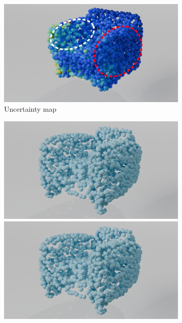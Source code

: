 \begin{figure}[htb]
\begin{subfigure}[t]{0.315\textwidth}
            \includegraphics[width=\textwidth]{figures/percent/1024_umap_edited.png}
            \caption{Uncertainty map}\label{fig:partialpercentchair2}
          \end{subfigure}\hfill
          \begin{subfigure}[t]{0.315\textwidth}
            \includegraphics[width=\textwidth]{figures/percent/chair_comp.png}
            \includegraphics[width=\textwidth]{figures/percent/chair_comp.png}

\end{subfigure}
\end{figure}
